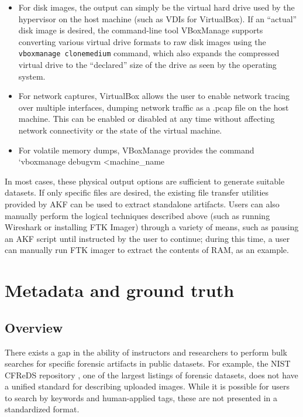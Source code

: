 \begin{itemize}
\tightlist
\item
  For disk images, the output can simply be the virtual hard drive used
  by the hypervisor on the host machine (such as VDIs for VirtualBox).
  If an ``actual'' disk image is desired, the command-line tool
  VBoxManage supports converting various virtual drive formats to raw
  disk images using the \passthrough{\lstinline!vboxmanage clonemedium!}
  command, which also expands the compressed virtual drive to the
  ``declared'' size of the drive as seen by the operating system.\\
\item
  For network captures, VirtualBox allows the user to enable network
  tracing over multiple interfaces, dumping network traffic as a .pcap
  file on the host machine. This can be enabled or disabled at any time
  without affecting network connectivity or the state of the virtual
  machine.\\
\item
  For volatile memory dumps, VBoxManage provides the command `vboxmanage
  debugvm \textless machine\_name
\end{itemize}

In most cases, these physical output options are sufficient to generate
suitable datasets. If only specific files are desired, the existing file
transfer utilities provided by AKF can be used to extract standalone
artifacts. Users can also manually perform the logical techniques
described above (such as running Wireshark or installing FTK Imager)
through a variety of means, such as pausing an AKF script until
instructed by the user to continue; during this time, a user can
manually run FTK imager to extract the contents of RAM, as an example.

\section{Metadata and ground
truth}\label{metadata-and-ground-truth}

\subsection{Overview}\label{overview-1}

There exists a gap in the ability of instructors and researchers to
perform bulk searches for specific forensic artifacts in public
datasets. For example, the NIST CFReDS repository
\cite{nationalinstituteofstandardsandtechnologyCFReDSPortal}, one of
the largest listings of forensic datasets, does not have a unified
standard for describing uploaded images. While it is possible for users
to search by keywords and human-applied tags, these are not presented in
a standardized format.

